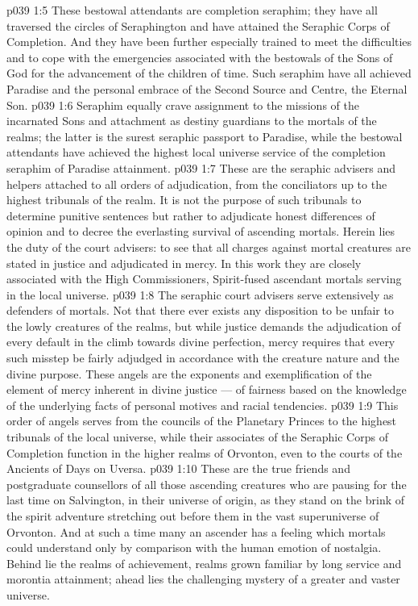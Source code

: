 \vs p039 1:5 These bestowal attendants are completion seraphim; they have all traversed the circles of Seraphington and have attained the Seraphic Corps of Completion. And they have been further especially trained to meet the difficulties and to cope with the emergencies associated with the bestowals of the Sons of God for the advancement of the children of time. Such seraphim have all achieved Paradise and the personal embrace of the Second Source and Centre, the Eternal Son.
\vs p039 1:6 Seraphim equally crave assignment to the missions of the incarnated Sons and attachment as destiny guardians to the mortals of the realms; the latter is the surest seraphic passport to Paradise, while the bestowal attendants have achieved the highest local universe service of the completion seraphim of Paradise attainment.
\vs p039 1:7 \bibnobreakspace {} These are the seraphic advisers and helpers attached to all orders of adjudication, from the conciliators up to the highest tribunals of the realm. It is not the purpose of such tribunals to determine punitive sentences but rather to adjudicate honest differences of opinion and to decree the everlasting survival of ascending mortals. Herein lies the duty of the court advisers: to see that all charges against mortal creatures are stated in justice and adjudicated in mercy. In this work they are closely associated with the High Commissioners, Spirit\hyp{}fused ascendant mortals serving in the local universe.
\vs p039 1:8 The seraphic court advisers serve extensively as defenders of mortals. Not that there ever exists any disposition to be unfair to the lowly creatures of the realms, but while justice demands the adjudication of every default in the climb towards divine perfection, mercy requires that every such misstep be fairly adjudged in accordance with the creature nature and the divine purpose. These angels are the exponents and exemplification of the element of mercy inherent in divine justice --- of fairness based on the knowledge of the underlying facts of personal motives and racial tendencies.
\vs p039 1:9 This order of angels serves from the councils of the Planetary Princes to the highest tribunals of the local universe, while their associates of the Seraphic Corps of Completion function in the higher realms of Orvonton, even to the courts of the Ancients of Days on Uversa.
\vs p039 1:10 \bibnobreakspace {} These are the true friends and postgraduate counsellors of all those ascending creatures who are pausing for the last time on Salvington, in their universe of origin, as they stand on the brink of the spirit adventure stretching out before them in the vast superuniverse of Orvonton. And at such a time many an ascender has a feeling which mortals could understand only by comparison with the human emotion of nostalgia. Behind lie the realms of achievement, realms grown familiar by long service and morontia attainment; ahead lies the challenging mystery of a greater and vaster universe.
